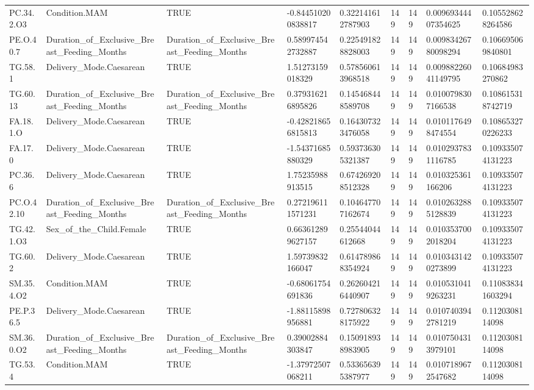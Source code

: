 \begin{longtable}{lllllllll}
PC.34.2.O3 & Condition.MAM & TRUE & -0.844510200838817 & 0.322141612787903 & 149 & 149 & 0.00969344407354625 & 0.105528628264586 \\
PE.O.40.7 & Duration\_of\_Exclusive\_Breast\_Feeding\_Months & Duration\_of\_Exclusive\_Breast\_Feeding\_Months & 0.589974542732887 & 0.225491828828003 & 149 & 149 & 0.00983426780098294 & 0.106695069840801 \\
TG.58.1 & Delivery\_Mode.Caesarean & TRUE & 1.51273159018329 & 0.578560613968518 & 149 & 149 & 0.00988226041149795 & 0.10684983270862 \\
TG.60.13 & Duration\_of\_Exclusive\_Breast\_Feeding\_Months & Duration\_of\_Exclusive\_Breast\_Feeding\_Months & 0.379316216895826 & 0.145468448589708 & 149 & 149 & 0.0100798307166538 & 0.108615318742719 \\
FA.18.1.O & Delivery\_Mode.Caesarean & TRUE & -0.428218656815813 & 0.164307323476058 & 149 & 149 & 0.0101176498474554 & 0.108653270226233 \\
FA.17.0 & Delivery\_Mode.Caesarean & TRUE & -1.54371685880329 & 0.593736305321387 & 149 & 149 & 0.0102937831116785 & 0.109335074131223 \\
PC.36.6 & Delivery\_Mode.Caesarean & TRUE & 1.75235988913515 & 0.674269208512328 & 149 & 149 & 0.010325361166206 & 0.109335074131223 \\
PC.O.42.10 & Duration\_of\_Exclusive\_Breast\_Feeding\_Months & Duration\_of\_Exclusive\_Breast\_Feeding\_Months & 0.272196111571231 & 0.104647707162674 & 149 & 149 & 0.0102632885128839 & 0.109335074131223 \\
TG.42.1.O3 & Sex\_of\_the\_Child.Female & TRUE & 0.663612899627157 & 0.25544044612668 & 149 & 149 & 0.0103537002018204 & 0.109335074131223 \\
TG.60.2 & Delivery\_Mode.Caesarean & TRUE & 1.59739832166047 & 0.614789868354924 & 149 & 149 & 0.0103431420273899 & 0.109335074131223 \\
SM.35.4.O2 & Condition.MAM & TRUE & -0.68061754691836 & 0.262604216440907 & 149 & 149 & 0.0105310419263231 & 0.110838341603294 \\
PE.P.36.5 & Delivery\_Mode.Caesarean & TRUE & -1.88115898956881 & 0.727806328175922 & 149 & 149 & 0.0107403942781219 & 0.1120308114098 \\
SM.36.0.O2 & Duration\_of\_Exclusive\_Breast\_Feeding\_Months & Duration\_of\_Exclusive\_Breast\_Feeding\_Months & 0.39002884303847 & 0.150918938983905 & 149 & 149 & 0.0107504313979101 & 0.1120308114098 \\
TG.53.4 & Condition.MAM & TRUE & -1.37972507068211 & 0.533656395387977 & 149 & 149 & 0.0107189672547682 & 0.1120308114098 \\

\end{longtable}
